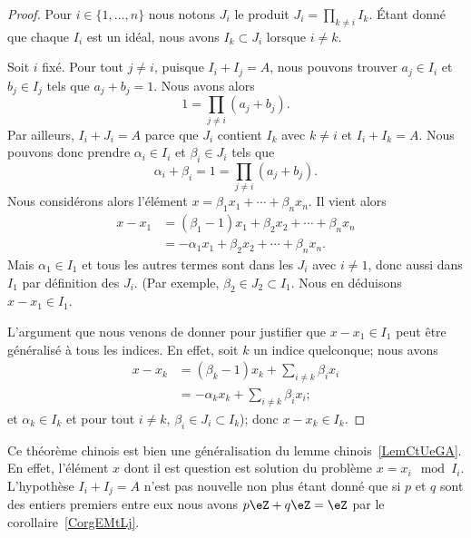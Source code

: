\begin{proof}
    Pour \( i\in\{ 1,\ldots,n \}\) nous notons \( J_i\) le produit \( J_i=\prod_{k\neq i}I_k\). Étant donné que chaque \( I_i\) est un idéal, nous avons \( I_k\subset J_i\) lorsque \( i\neq k\).

    Soit \( i\) fixé. Pour tout \( j\neq i\), puisque \( I_i+I_j=A\), nous pouvons trouver \( a_j\in I_i\) et \( b_j\in I_j\) tels que \( a_j+b_j=1\). Nous avons alors
    \begin{equation}
        1=\prod_{j\neq i}(a_j+b_j).
    \end{equation}
    Par ailleurs, \( I_i+J_i=A\) parce que \( J_i\) contient \( I_k\) avec \( k\neq i\) et \( I_i+I_k=A\). Nous pouvons donc prendre \( \alpha_i\in I_i\) et \( \beta_i\in J_i\) tels que
    \begin{equation}
        \alpha_i+\beta_i = 1 = \prod_{j\neq i}(a_j+b_j).
    \end{equation}
    Nous considérons alors l'élément \( x=\beta_1x_1+\cdots+\beta_nx_n\). Il vient alors
    \begin{subequations}
        \begin{align}
            x-x_1&=(\beta_1-1)x_1+\beta_2x_2+\cdots+\beta_nx_n\\
            &=-\alpha_1x_1+\beta_2x_2+\cdots+\beta_nx_n.
        \end{align}
    \end{subequations}
    Mais \( \alpha_1\in I_1\) et tous les autres termes sont dans les \( J_i\) avec \( i\neq 1\), donc aussi dans \( I_1 \) par définition des \( J_i \). (Par exemple,  \( \beta_2\in J_2\subset I_1\).  Nous en déduisons \( x - x_1 \in I_1\).

    L'argument que nous venons de donner pour justifier que \(x - x_1 \in I_1 \) peut être généralisé à tous les indices. En effet, soit \( k \) un indice quelconque; nous avons
     \begin{subequations}
        \begin{align}
            x-x_k&=(\beta_k-1)x_k+\sum_{i \neq k} \beta_ix_i\\
            &=-\alpha_kx_k+\sum_{i \neq k} \beta_ix_i;
        \end{align}
    \end{subequations}
    et \( \alpha_k\in I_k\) et pour tout \( i \neq k \), \( \beta_i\in J_i\subset I_k\)); donc \( x - x_k \in I_k\).
\end{proof}

\begin{remark}
    Ce théorème chinois est bien une généralisation du lemme chinois~\ref{LemCtUeGA}. En effet, l'élément \( x\) dont il est question est solution du problème \( x=x_i\mod I_i\). L'hypothèse \( I_i+I_j=A\) n'est pas nouvelle non plus étant donné que si \( p\) et \( q\) sont des entiers premiers entre eux nous avons \( p\eZ+q\eZ=\eZ\) par le corollaire~\ref{CorgEMtLj}.
\end{remark}

